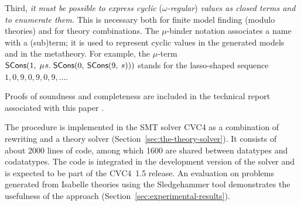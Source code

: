 Third, \emph{it must be possible to express cyclic }(\emph{$\omega$-regular}) \emph{values as closed terms and
to enumerate them.} This is necessary both for finite model finding (modulo theories)
and for theory combinations. The $\mu$-binder notation associates a name with
a (sub)term; it is used to represent cyclic values in the generated models and
in the metatheory. For example,
the $\mu$-term $\const{SCons}(1,\: \MU s.\; \const{SCons}(0,\: \const{SCons}(9,\: s)))$
stands for the lasso-shaped sequence $1, 0, 9, 0, 9, 0, 9, \ldots$\afterLdots.



\begin{paper}
Proofs of soundness and completeness are included in the technical report
associated with this paper \cite{our-report}.
\end{paper}%
The procedure is implemented in the SMT solver CVC4 as a combination
of rewriting and a theory solver
(Section~\ref{sec:the-theory-solver}).
It consists of about 2000 lines of \cpp{} code, among which 1600 are
shared between datatypes and codatatypes. The code is integrated in the
development version of the solver and is expected to be part of the CVC4~1.5 release.
%
An evaluation on %
problems generated from Isabelle theories using the Sledgehammer tool
demonstrates the usefulness of the approach (Section~\ref{sec:experimental-results}).



%





